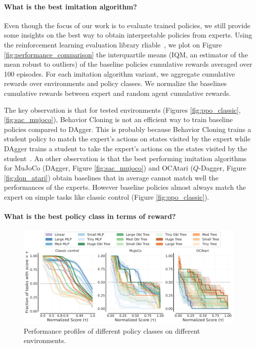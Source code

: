 \paragraph{What is the best imitation algorithm?}
Even though the focus of our work is to evaluate trained policies, we still provide some insights on the best way to obtain interpretable policies from experts. Using the reinforcement learning evaluation library rliable~\cite{rliable}, we plot on Figure \ref{fig:performance_comparison} the interquartile means (IQM, an estimator of the mean robust to outliers) of the baseline policies cumulative rewards averaged over 100 episodes. For each imitation algorithm variant, we aggregate cumulative rewards over environments and policy classes. We normalize the baselines cumulative rewards between expert and random agent cumulative rewards.

The key observation is that for tested environments (Figures \ref{fig:ppo_classic},\ref{fig:sac_mujoco}), Behavior Cloning is not an efficient way to train baseline policies compared to DAgger. This is probably because Behavior Cloning trains a student policy to match the expert's actions on states visited by the expert while DAgger trains a student to take the expert's actions on the states visited by the student~\cite{dagger}. An other observation is that the best performing imitation algorithms for MuJoCo (DAgger, Figure \ref{fig:sac_mujoco}) and OCAtari ($Q$-Dagger, Figure \ref{fig:dqn_atari}) obtain baselines that in average cannot match well the performances of the experts. However baseline policies almost always match the expert on simple tasks like classic control (Figure \ref{fig:ppo_classic}).

\paragraph{What is the best policy class in terms of reward?}

\begin{figure}[ht]
    \centering
    \includegraphics[trim={0 0 0 0.2cm},clip,width=0.9\linewidth]{images/images_part3/perf_profile_combined_100k.pdf}
    \caption{Performance profiles of different policy classes on different environments.}
    \label{fig:perf-combined}
\end{figure}

